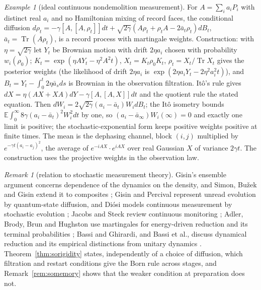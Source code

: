 \documentclass[aps,pra,onecolumn,superscriptaddress,nofootinbib,10pt]{revtex4-2}
\theoremstyle{definition}
\theoremstyle{remark}
\newtheorem{remark}[theorem]{Remark}
\newtheorem{example}[theorem]{Example}
\newcommand{\tr}{\operatorname{Tr}}
\begin{document}
\begin{example}[ideal continuous nondemolition measurement]\label{ex:sodiffusion}
For $A=\sum_ia_iP_i$ with distinct real $a_i$ and no Hamiltonian mixing of record faces, the conditional diffusion
$d\rho_t=-\gamma[A,[A,\rho_t]]dt+\sqrt{2\gamma}(A\rho_t+\rho_tA-2\bar a_t\rho_t)dB_t$, $\bar a_t=\tr(A\rho_t)$, is a record process with martingale weights.
Construction: with $\eta=\sqrt{2\gamma}$ let $Y_t$ be Brownian motion with drift $2\eta a_i$ chosen with probability $w_i(\rho_0)$;
$K_t=\exp(\eta AY_t-\eta^2A^2t)$, $X_t=K_t\rho_0K_t$, $\rho_t=X_t/\tr X_t$ gives the posterior weights (the likelihood of drift $2\eta a_i$
is $\exp(2\eta a_iY_t-2\eta^2a_i^2t)$), and $B_t=Y_t-\int_0^t2\eta\bar a_sds$ is Brownian in the observation filtration.  It\^o's rule gives
$dX=\eta(AX+XA)dY-\gamma[A,[A,X]]dt$ and the quotient rule the stated equation.  Then
$dW_i=2\sqrt{2\gamma}(a_i-\bar a_t)W_idB_t$; the It\^o isometry bounds $\mathbb E\int_0^\infty8\gamma(a_i-\bar a_t)^2W_i^2dt$ by one, so $(a_i-\bar a_\infty)W_i(\infty)=0$ and exactly
one limit is positive; the stochastic-exponential form keeps positive weights positive at finite times.
The mean is the dephasing channel, block $(i,j)$ multiplied by $e^{-\gamma t(a_i-a_j)^2}$, the average of $e^{-iAX}\cdot e^{iAX}$ over real
Gaussian $X$ of variance $2\gamma t$.  The construction uses the projective weights in the observation law.
\end{example}

\begin{remark}[relation to stochastic measurement theory]\label{rem:sohistory}
Gisin's ensemble argument concerns dependence of the dynamics on the density, and Simon, Bu\v{z}ek and
Gisin extend it to composites \cite{n3:Gisin,n3:Simon}; Gisin and Percival represent unread evolution by
quantum-state diffusion, and Di\'osi models continuous measurement by stochastic evolution
\cite{n3:GisinPercival,n3:Diosi}; Jacobs and Steck review continuous monitoring \cite{n3:Jacobs}; Adler,
Brody, Brun and Hughston use martingales for energy-driven reduction and its terminal probabilities
\cite{n3:Adler}; Bassi and Ghirardi, and Bassi et al., discuss dynamical reduction and its empirical
distinctions from unitary dynamics \cite{n3:BassiGhirardi,n3:Bassi}.  Theorem~\ref{thm:sorigidity} states, independently of a
choice of diffusion, which filtration and restart conditions give the Born rule across stages, and
Remark~\ref{rem:somemory} shows that the weaker condition at preparation does not.
\end{remark}
\end{document}
